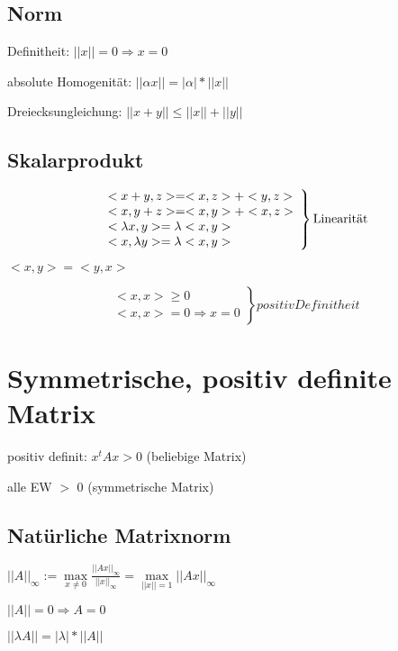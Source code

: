\documentclass[12pt,a4paper]{article} %
\begin{document}
	\subsection{Norm}
		Definitheit: $||x|| = 0 \Rightarrow x = 0$
		
		absolute Homogenität: $||\alpha x|| = |\alpha| * ||x||$
		
		Dreiecksungleichung: $||x + y|| \le ||x|| + ||y||$
	
	\subsection{Skalarprodukt}
	
		\[
			\left.
				\begin{array}{l}
					<x + y, z> = <x, z> + <y, z> \\
					<x, y + z> = <x, y> + <x, z> \\
					<\lambda x, y> = \lambda <x, y> \\
					<x, \lambda y> = \lambda <x, y>
				\end{array}
			\right \} \textnormal{Linearität}
		\]
		
		\begin{math}
			<x, y> = <y, x>
		\end{math}
		
		\[
			\left.
				\begin{array}{l}
					<x, x> \ge 0 \\
					<x, x> = 0 \Rightarrow x = 0
				\end{array}
			\right \} positiv Definitheit
		\]
	
	\section{Symmetrische, positiv definite Matrix}
	
	positiv definit: $x^t Ax > 0$ (beliebige Matrix)
	
	alle EW $>$ 0 (symmetrische Matrix)
	
	\subsection{Natürliche Matrixnorm}
	
	$||A||_\infty := \max\limits_{x \ne 0} \frac{||Ax||_\infty}{||x||_\infty} = \max\limits_{||x|| = 1}||Ax||_\infty$
	
	$||A|| = 0 \Rightarrow A = 0 $
	
	$||\lambda A|| = |\lambda|*||A|| $
	
\end{document}
